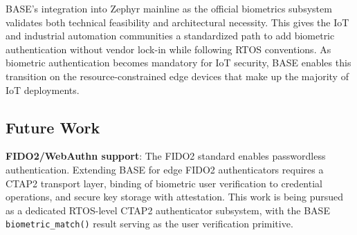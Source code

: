 BASE's integration into Zephyr mainline as the official biometrics subsystem validates both technical feasibility and architectural necessity. This gives the IoT and industrial automation communities a standardized path to add biometric authentication without vendor lock-in while following RTOS conventions. As biometric authentication becomes mandatory for IoT security, BASE enables this transition on the resource-constrained edge devices that make up the majority of IoT deployments.

\subsection{Future Work}
\label{sec:future_work}

\textbf{FIDO2/WebAuthn support}: The FIDO2 standard enables passwordless authentication\cite{tran2024biometrics}. Extending BASE for edge FIDO2 authenticators requires a CTAP2 transport layer, binding of biometric user verification to credential operations, and secure key storage with attestation. This work is being pursued as a dedicated RTOS-level CTAP2 authenticator subsystem, with the BASE \texttt{biometric\_match()} result serving as the user verification primitive.